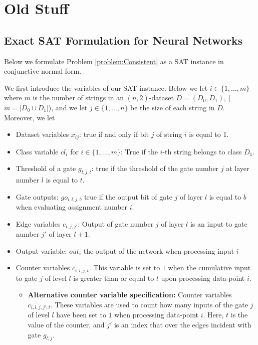 \section{Old Stuff}


\subsection{ Exact SAT Formulation for Neural Networks}

Below we formulate Problem \ref{problem:Consistent} as a SAT instance in conjunctive normal form.

\noindent We first introduce the variables of our SAT instance. Below we let $i\in \{1,\dots,m\}$ where $m$ is the number of strings in an $(n,2)$-dataset $D = (D_0,D_1)$, ($m = |D_0 \cup D_1|$), and we let $j\in \{1,\dots, n\}$ be the size of each string in $D$. Moreover, we let 
\begin{itemize}
    \item Dataset variables $x_{ij}$: true if and only if bit $j$ of string $i$ is equal to 1. 
    \item Class variable $cl_{i}$ for $i\in \{1,\dots,m\}$:  True if the $i$-th string belongs to class $D_1$.
    \item Threshold of a gate $g_{l,j,t}$: true if the threshold of the gate number $j$ at layer number $l$ is equal to $t$. 
    \item Gate outputs: $go_{i,l,j,b}$ true if the output bit of gate $j$ of layer $l$ is equal to $b$ when evaluating assignment number $i$. 
    \item Edge variables $e_{l,j,j'}$: Output of gate number $j$ of layer $l$ is an input to gate number $j'$ of layer $l+1$.
    \item Output variable: $out_{i}$ the output of the network when processing input $i$  
    \item Counter variables $c_{i,l,j,t}$. This variable is set to $1$ when the cumulative input to gate $j$ of level $l$ is greater than or equal to $t$ upon processing data-point $i$. 
    \begin{itemize}
        \item \textbf{Alternative counter variable specification:} Counter variables $c_{i,l,j,j',t}$. These variables are used to count how many inputs of the gate $j$ of level $l$ have been set to $1$ when processing data-point $i$. Here, $t$ is the value of the counter, and $j'$ is an index that over the edges incident with gate $g_{l,j}$.
    \end{itemize} 
\end{itemize}


